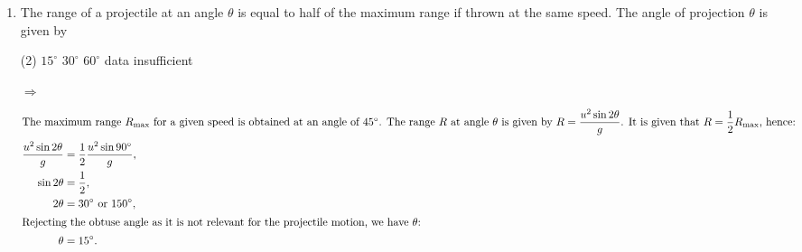 \documentclass{article}
\renewcommand{\frac}[2]{\dfrac{#1}{#2}}
\newenvironment{solution}{\par\noindent\color{red!85!black}$\Rightarrow$\vspace{0em}}{}
\begin{document}
\begin{enumerate}
    \item The range of a projectile at an angle \(\theta\) is equal to half of the maximum range if thrown at the same speed. The angle of projection \(\theta\) is given by
        \begin{tasks}(2)
            \task \(15^\circ\)
            \task \(30^\circ\) \ans
            \task \(60^\circ\)
            \task data insufficient
        \end{tasks}
    \begin{solution}
        \begin{align*}
            \intertext{The maximum range \(R_{\text{max}}\) for a given speed is obtained at an angle of \(45^\circ\). The range \(R\) at angle \(\theta\) is given by \(R = \frac{u^2 \sin 2\theta}{g}\). It is given that \(R = \frac{1}{2}R_{\text{max}}\), hence:}
            \frac{u^2 \sin 2\theta}{g} &= \frac{1}{2} \frac{u^2 \sin 90^\circ}{g}, \\
            \sin 2\theta &= \frac{1}{2}, \\
            2\theta &= 30^\circ \text{ or } 150^\circ, \\
            \intertext{Rejecting the obtuse angle as it is not relevant for the projectile motion, we have \(\theta\):}
            \theta &= 15^\circ.
        \end{align*}
    \end{solution}
    

\end{enumerate}
\end{document}
